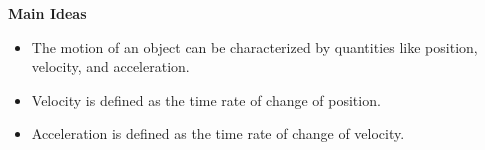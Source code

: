 \documentclass[]{article}
\begin{document}
\newpage
\begin{TeacherMargin}

\end{TeacherMargin}
\begin{PresentSpace}

\end{PresentSpace}
\newpage
\begin{TeacherMargin}

\end{TeacherMargin}
\begin{PresentSpace}
\textbf{Main Ideas}
\begin{itemize}
	\item The motion of an object can be characterized by quantities like position, velocity, and acceleration.
	\item Velocity is defined as the time rate of change of position.
	\item Acceleration is defined as the time rate of change of velocity.
\end{itemize}
\end{PresentSpace}
\end{document}
